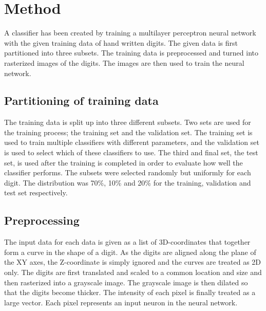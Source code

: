 \documentclass[report.tex]{subfile}
\begin{document}
\section{Method}
A classifier has been created by training a multilayer perceptron neural
network with the given training data of hand written digits. The given data is
first partitioned into three subsets. The training data is preprocessed and
turned into rasterized images of the digits. The images are then used to train
the neural network.

\subsection{Partitioning of training data}
The training data is split up into three different subsets. Two sets are used
for the training process; the training set and the validation set. The training
set is used to train multiple classifiers with different parameters, and the
validation set is used to select which of these classifiers to use. The third
and final set, the test set, is used after the training is completed in order
to evaluate how well the classifier performs. The subsets were selected
randomly but uniformly for each digit. The distribution was 70\%, 10\% and 20\%
for the training, validation and test set respectively.

\subsection{Preprocessing}
The input data for each data is given as a list of 3D-coordinates that together
form a curve in the shape of a digit. As the digits are aligned along the plane
of the XY axes, the Z-coordinate is simply ignored and the curves are treated
as 2D only. The digits are first translated and scaled to a common location and
size and then rasterized into a grayscale image. The grayscale image is then
dilated so that the digits become thicker. The intensity of each pixel is
finally treated as a large vector. Each pixel represents an input neuron in the
neural network.
\end{document}
